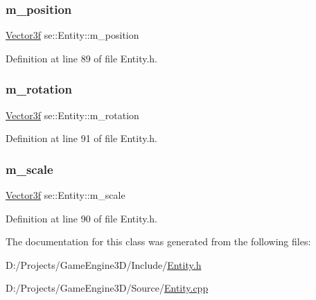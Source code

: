 \subsubsection{\texorpdfstring{m\+\_\+position}{m\_position}}
{\footnotesize\ttfamily \mbox{\hyperlink{namespacese_a12e07512d95e2fdebdaf74a5ea2cf5f6}{Vector3f}} se\+::\+Entity\+::m\+\_\+position\hspace{0.3cm}{\ttfamily [protected]}}



Definition at line 89 of file Entity.\+h.

\mbox{\label{classse_1_1_entity_ad1cfc08dd4df9fe2a2633a6c2cd3e402}} 
\subsubsection{\texorpdfstring{m\+\_\+rotation}{m\_rotation}}
{\footnotesize\ttfamily \mbox{\hyperlink{namespacese_a12e07512d95e2fdebdaf74a5ea2cf5f6}{Vector3f}} se\+::\+Entity\+::m\+\_\+rotation\hspace{0.3cm}{\ttfamily [protected]}}



Definition at line 91 of file Entity.\+h.

\mbox{\label{classse_1_1_entity_a9c2c8636093982abc56960b947958b34}} 
\subsubsection{\texorpdfstring{m\+\_\+scale}{m\_scale}}
{\footnotesize\ttfamily \mbox{\hyperlink{namespacese_a12e07512d95e2fdebdaf74a5ea2cf5f6}{Vector3f}} se\+::\+Entity\+::m\+\_\+scale\hspace{0.3cm}{\ttfamily [protected]}}



Definition at line 90 of file Entity.\+h.



The documentation for this class was generated from the following files\+:\begin{DoxyCompactItemize}
\item 
D\+:/\+Projects/\+Game\+Engine3\+D/\+Include/\mbox{\hyperlink{_entity_8h}{Entity.\+h}}\item 
D\+:/\+Projects/\+Game\+Engine3\+D/\+Source/\mbox{\hyperlink{_entity_8cpp}{Entity.\+cpp}}\end{DoxyCompactItemize}
